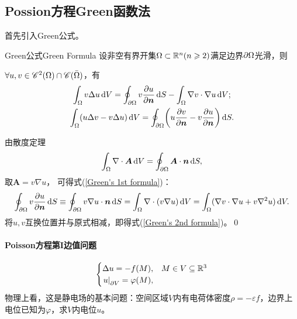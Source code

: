 \subsection{Possion方程Green函数法}
首先引入Green公式。
\begin{theorem}{Green公式}{Green Formula}
	设非空有界开集$\Omega\subset\mathbb R^n(n\geqslant 2)$满足边界$\partial\Omega$光滑，则
	
	$\forall u,v\in\mathscr C^2(\Omega)\cap\mathscr C(\bar\Omega)$，有
	\begin{gather}
		\label{Green's 1st formula}
		\int_\Omega v\lap u\d V=\oint_{\p\Omega}v\pv u{\bm n}\d S-\int_\Omega\nabla v\cdot\nabla u\d V;\\
		\label{Green's 2nd formula}
		\int_\Omega(u\lap v-v\lap u)\d V=\oint_{\p\Omega}\biggkh{u\pv v{\bm n}-v\pv u{\bm n}}\d S.
	\end{gather}
\end{theorem}
\prf 由散度定理
\begin{align}
	\int_\Omega\nabla\cdot\bm A\mathop{}\!\mathrm{d} V=\oint_{\partial\Omega}\bm A\cdot\bm n\mathop{}\!\mathrm{d} S,
\end{align}
取$\bm A=v\nabla u$，
可得式(\ref{Green's 1st formula})：
\[
	\oint_{\p\Omega}v\pv u{\bm n}\d S\equiv\oint_{\p\Omega}v\nabla u\cdot\bm n\d S=\int_\Omega\div(v\nabla u)\d V=\int_\Omega(\nabla v\cdot\nabla u+v\nabla^2u)\d V.
\]
将$u,v$互换位置并与原式相减，即得式(\ref{Green's 2nd formula})。\qed
\paragraph*{Poisson方程第I边值问题}
\begin{align}
	\begin{cases}
		\Delta u=-f(M),&M\in V\subseteq\mathbb R^3\\
		\left.u\right\rvert_{\partial V}=\varphi(M),
	\end{cases}
\end{align}
物理上看，这是静电场的基本问题：空间区域$V$内有电荷体密度$\rho=-\varepsilon f$，边界上电位已知为$\varphi$，求$V$内电位$u$。

